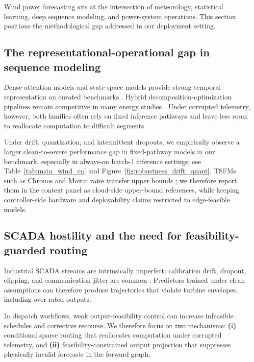\documentclass[review,1p,times]{elsarticle}
\begin{document}
Wind power forecasting sits at the intersection of meteorology, statistical learning, deep sequence modeling, and power-system operations. This section positions the methodological gap addressed in our deployment setting.

\subsection{The representational-operational gap in sequence modeling}
\label{subsec:related_gap}
\label{subsec:related_deep}
\label{subsec:related_hybrid}
\label{subsec:related_tsfm}

Dense attention models and state-space models provide strong temporal representation on curated benchmarks \citep{wu2021autoformer,zhou2022fedformer,liu2024itransformer,gu2023mamba}. Hybrid decomposition-optimization pipelines remain competitive in many energy studies \citep{xue2020ssawind,niu2020ceemdanbi,li2023vmdcnn}. Under corrupted telemetry, however, both families often rely on fixed inference pathways and leave less room to reallocate computation to difficult segments.

Under drift, quantization, and intermittent dropouts, we empirically observe a larger clean-to-severe performance gap in fixed-pathway models in our benchmark, especially in always-on batch-1 inference settings; see Table~\ref{tab:main_wind_cn} and Figure~\ref{fig:robustness_drift_quant}. TSFMs such as Chronos and Moirai raise transfer upper bounds \citep{ansari2024chronos,woo2024moirai,liu2024moiraimoe}; we therefore report them in the context panel as cloud-side upper-bound references, while keeping controller-side hardware and deployability claims restricted to edge-feasible models.

\subsection{SCADA hostility and the need for feasibility-guarded routing}
\label{subsec:related_physics}

Industrial SCADA streams are intrinsically imperfect: calibration drift, dropout, clipping, and communication jitter are common \citep{ren2020scada}. Predictors trained under clean assumptions can therefore produce trajectories that violate turbine envelopes, including over-rated outputs.

In dispatch workflows, weak output-feasibility control can increase infeasible schedules and corrective recourse. We therefore focus on two mechanisms: \textbf{(i)} conditional sparse routing that reallocates computation under corrupted telemetry, and \textbf{(ii)} feasibility-constrained output projection that suppresses physically invalid forecasts in the forward graph.
\end{document}
